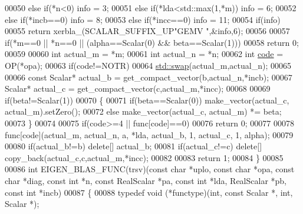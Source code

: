 \begin{DoxyCode}
00050   \textcolor{keywordflow}{else} \textcolor{keywordflow}{if}(*n<0)                   info = 3;
00051   \textcolor{keywordflow}{else} \textcolor{keywordflow}{if}(*lda<std::max(1,*m))    info = 6;
00052   \textcolor{keywordflow}{else} \textcolor{keywordflow}{if}(*incb==0)               info = 8;
00053   \textcolor{keywordflow}{else} \textcolor{keywordflow}{if}(*incc==0)               info = 11;
00054   \textcolor{keywordflow}{if}(info)
00055     \textcolor{keywordflow}{return} xerbla\_(SCALAR\_SUFFIX\_UP\textcolor{stringliteral}{"GEMV "},&info,6);
00056 
00057   \textcolor{keywordflow}{if}(*m==0 || *n==0 || (alpha==Scalar(0) && beta==Scalar(1)))
00058     \textcolor{keywordflow}{return} 0;
00059 
00060   \textcolor{keywordtype}{int} actual\_m = *m;
00061   \textcolor{keywordtype}{int} actual\_n = *n;
00062   \textcolor{keywordtype}{int} \hyperlink{structcode}{code} = OP(*opa);
00063   \textcolor{keywordflow}{if}(code!=NOTR)
00064     \hyperlink{endian_8c_a3ca5ecd34b04d6a243c054ac3a57f68d}{std::swap}(actual\_m,actual\_n);
00065 
00066   \textcolor{keyword}{const} Scalar* actual\_b = get\_compact\_vector(b,actual\_n,*incb);
00067   Scalar* actual\_c = get\_compact\_vector(c,actual\_m,*incc);
00068 
00069   \textcolor{keywordflow}{if}(beta!=Scalar(1))
00070   \{
00071     \textcolor{keywordflow}{if}(beta==Scalar(0)) make\_vector(actual\_c, actual\_m).setZero();
00072     \textcolor{keywordflow}{else}                make\_vector(actual\_c, actual\_m) *= beta;
00073   \}
00074 
00075   \textcolor{keywordflow}{if}(code>=4 || func[code]==0)
00076     \textcolor{keywordflow}{return} 0;
00077 
00078   func[code](actual\_m, actual\_n, a, *lda, actual\_b, 1, actual\_c, 1, alpha);
00079 
00080   \textcolor{keywordflow}{if}(actual\_b!=b) \textcolor{keyword}{delete}[] actual\_b;
00081   \textcolor{keywordflow}{if}(actual\_c!=c) \textcolor{keyword}{delete}[] copy\_back(actual\_c,c,actual\_m,*incc);
00082 
00083   \textcolor{keywordflow}{return} 1;
00084 \}
00085 
00086 \textcolor{keywordtype}{int} EIGEN\_BLAS\_FUNC(trsv)(\textcolor{keyword}{const} \textcolor{keywordtype}{char} *uplo, \textcolor{keyword}{const} \textcolor{keywordtype}{char} *opa, \textcolor{keyword}{const} \textcolor{keywordtype}{char} *diag, \textcolor{keyword}{const} \textcolor{keywordtype}{int} *n, \textcolor{keyword}{const} 
      RealScalar *pa, \textcolor{keyword}{const} \textcolor{keywordtype}{int} *lda, RealScalar *pb, \textcolor{keyword}{const} \textcolor{keywordtype}{int} *incb)
00087 \{
00088   \textcolor{keyword}{typedef} void (*functype)(int, \textcolor{keyword}{const} Scalar *, int, Scalar *);

\end{DoxyCode}
